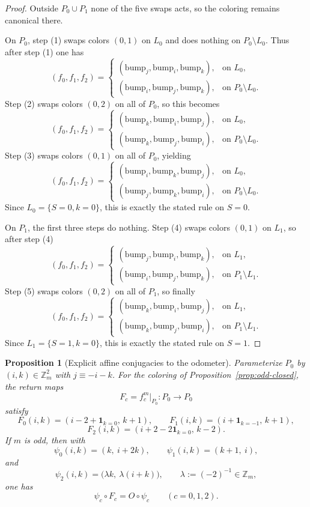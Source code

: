 \documentclass[11pt]{article}
\newtheorem{proposition}{Proposition}
\newcommand{\Zm}{\mathbb Z_m}
\begin{document}
\begin{proof}
Outside $P_0\cup P_1$ none of the five swaps acts, so the coloring remains canonical there.

On $P_0$, step (1) swaps colors $(0,1)$ on $L_0$ and does nothing on $P_0\setminus L_0$.
Thus after step (1) one has
\[
(f_0,f_1,f_2)=
\begin{cases}
(\mathrm{bump}_j,\mathrm{bump}_i,\mathrm{bump}_k), & \text{on }L_0,\\
(\mathrm{bump}_i,\mathrm{bump}_j,\mathrm{bump}_k), & \text{on }P_0\setminus L_0.
\end{cases}
\]
Step (2) swaps colors $(0,2)$ on all of $P_0$, so this becomes
\[
(f_0,f_1,f_2)=
\begin{cases}
(\mathrm{bump}_k,\mathrm{bump}_i,\mathrm{bump}_j), & \text{on }L_0,\\
(\mathrm{bump}_k,\mathrm{bump}_j,\mathrm{bump}_i), & \text{on }P_0\setminus L_0.
\end{cases}
\]
Step (3) swaps colors $(0,1)$ on all of $P_0$, yielding
\[
(f_0,f_1,f_2)=
\begin{cases}
(\mathrm{bump}_i,\mathrm{bump}_k,\mathrm{bump}_j), & \text{on }L_0,\\
(\mathrm{bump}_j,\mathrm{bump}_k,\mathrm{bump}_i), & \text{on }P_0\setminus L_0.
\end{cases}
\]
Since $L_0=\{S=0,k=0\}$, this is exactly the stated rule on $S=0$.

On $P_1$, the first three steps do nothing.
Step (4) swaps colors $(0,1)$ on $L_1$, so after step (4)
\[
(f_0,f_1,f_2)=
\begin{cases}
(\mathrm{bump}_j,\mathrm{bump}_i,\mathrm{bump}_k), & \text{on }L_1,\\
(\mathrm{bump}_i,\mathrm{bump}_j,\mathrm{bump}_k), & \text{on }P_1\setminus L_1.
\end{cases}
\]
Step (5) swaps colors $(0,2)$ on all of $P_1$, so finally
\[
(f_0,f_1,f_2)=
\begin{cases}
(\mathrm{bump}_k,\mathrm{bump}_i,\mathrm{bump}_j), & \text{on }L_1,\\
(\mathrm{bump}_k,\mathrm{bump}_j,\mathrm{bump}_i), & \text{on }P_1\setminus L_1.
\end{cases}
\]
Since $L_1=\{S=1,k=0\}$, this is exactly the stated rule on $S=1$.
\end{proof}

\begin{proposition}[Explicit affine conjugacies to the odometer]\label{prop:odd-odometer}
Parameterize $P_0$ by $(i,k)\in \Zm^2$ with $j\equiv -i-k$.
For the coloring of Proposition~\ref{prop:odd-closed}, the return maps
\[
F_c=f_c^m\big|_{P_0}:P_0\to P_0
\]
satisfy
\[
F_0(i,k)=(i-2+\mathbf 1_{k=0},\,k+1),\qquad
F_1(i,k)=(i+\mathbf 1_{k=-1},\,k+1),
\]
\[
F_2(i,k)=(i+2-2\mathbf 1_{k=0},\,k-2).
\]
If $m$ is odd, then with
\[
\psi_0(i,k)=(k,\ i+2k),\qquad
\psi_1(i,k)=(k+1,\ i),
\]
and
\[
\psi_2(i,k)=\bigl(\lambda k,\ \lambda(i+k)\bigr),
\qquad \lambda:=(-2)^{-1}\in\Zm,
\]
one has
\[
\psi_c\circ F_c = O\circ \psi_c
\qquad (c=0,1,2).
\]
\end{proposition}
\end{document}
